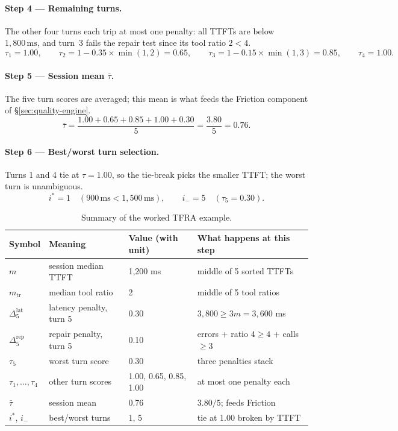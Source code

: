 \documentclass[11pt,a4paper]{article}
\begin{document}
\paragraph{Step 4 --- Remaining turns.}
The other four turns each trip at most one penalty: all TTFTs are below
$1{,}800\,\text{ms}$, and turn~3 fails the repair test since its tool
ratio $2 < 4$.
\[
  \tau_1 = 1.00, \qquad
  \tau_2 = 1 - 0.35 \times \min(1,2) = 0.65, \qquad
  \tau_3 = 1 - 0.15 \times \min(1,3) = 0.85, \qquad
  \tau_4 = 1.00.
\]

\paragraph{Step 5 --- Session mean $\bar{\tau}$.}
The five turn scores are averaged; this mean is what feeds the Friction
component of \S\ref{sec:quality-engine}.
\[
  \bar{\tau} = \frac{1.00 + 0.65 + 0.85 + 1.00 + 0.30}{5}
             = \frac{3.80}{5}
             = 0.76.
\]

\paragraph{Step 6 --- Best/worst turn selection.}
Turns 1 and 4 tie at $\tau = 1.00$, so the tie-break picks the smaller
TTFT; the worst turn is unambiguous.
\[
  i^* = 1 \quad (900\,\text{ms} < 1{,}500\,\text{ms}),
  \qquad
  i_- = 5 \quad (\tau_5 = 0.30).
\]

\begin{table}[h!]
\centering
\caption{Summary of the worked TFRA example.}
\label{tab:tfra-worked}
\begin{tabular}{@{}llll@{}}
\toprule
Symbol & Meaning & Value (with unit) & What happens at this step \\
\midrule
$m$ & session median TTFT & 1{,}200 ms & middle of 5 sorted TTFTs \\
$m_{\text{tr}}$ & median tool ratio & 2 & middle of 5 tool ratios \\
$\Delta^{\text{lat}}_5$ & latency penalty, turn 5 & 0.30 & $3{,}800 \geq 3m = 3{,}600$ ms \\
$\Delta^{\text{rep}}_5$ & repair penalty, turn 5 & 0.10 & errors + ratio $4 \geq 4$ + calls $\geq 3$ \\
$\tau_5$ & worst turn score & 0.30 & three penalties stack \\
$\tau_1, \ldots, \tau_4$ & other turn scores & 1.00, 0.65, 0.85, 1.00 & at most one penalty each \\
$\bar{\tau}$ & session mean & 0.76 & $3.80 / 5$; feeds Friction \\
$i^*$, $i_-$ & best/worst turns & 1, 5 & tie at 1.00 broken by TTFT \\
\bottomrule
\end{tabular}
\end{table}
\end{document}
